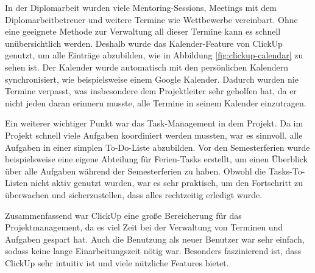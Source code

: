 In der Diplomarbeit wurden viele Mentoring-Sessions, Meetings mit dem Diplomarbeitbetreuer und weitere Termine wie Wettbewerbe vereinbart. Ohne eine geeignete Methode zur Verwaltung all dieser Termine kann es schnell unübersichtlich werden. Deshalb wurde das Kalender-Feature von ClickUp genutzt, um alle Einträge abzubilden, wie in Abbildung \ref{fig:clickup-calendar} zu sehen ist. Der Kalender wurde automatisch mit den persönlichen Kalendern synchronisiert, wie beispielsweise einem Google Kalender. Dadurch wurden nie Termine verpasst, was insbesondere dem Projektleiter sehr geholfen hat, da er nicht jeden daran erinnern musste, alle Termine in seinem Kalender einzutragen.

Ein weiterer wichtiger Punkt war das Task-Management in dem Projekt. Da im Projekt schnell viele Aufgaben koordiniert werden mussten, war es sinnvoll, alle Aufgaben in einer simplen To-Do-Liste abzubilden. Vor den Semesterferien wurde beispielsweise eine eigene Abteilung für Ferien-Tasks erstellt, um einen Überblick über alle Aufgaben während der Semesterferien zu haben. Obwohl die Tasks-To-Listen nicht aktiv genutzt wurden, war es sehr praktisch, um den Fortschritt zu überwachen und sicherzustellen, dass alles rechtzeitig erledigt wurde.

Zusammenfassend war ClickUp eine große Bereicherung für das
Projektmanagement, da es viel Zeit bei der Verwaltung von
Terminen und Aufgaben gespart hat. Auch die Benutzung als
neuer Benutzer war sehr einfach, sodass keine lange
Einarbeitungszeit nötig war. Besonders faszinierend ist,
dass ClickUp sehr intuitiv ist und viele nützliche Features
bietet.

